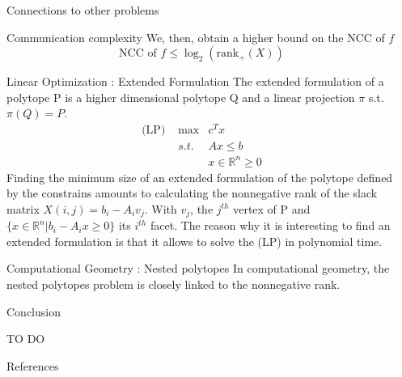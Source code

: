 \documentclass[final]{beamer}
\newlength{\sepwid}
\newlength{\onecolwid}
\begin{document}
\begin{frame}
\begin{columns}[t]
\begin{column}{\onecolwid}
\begin{columns}[t]
\begin{column}{\onecolwid}
\begin{exampleblock}{Connections to other problems}
\begin{block}{Communication complexity}
    We, then, obtain a higher bound on the NCC of $f$
    \[\text{NCC of } f \leq \log_2(\text{rank}_+(X))
    \]
\end{block}

\begin{block}{Linear Optimization : Extended Formulation}
The extended formulation of a polytope P is a higher dimensional polytope Q and a linear projection $\pi$ s.t. $\pi(Q) = P$.
    \begin{align*}
    \text{(LP) } & \max & c^T x\\
     &s.t. & Ax\leq b\\
     & & x \in \mathbb{R}^n \geq 0
    \end{align*}
    Finding the minimum size of an extended formulation of the polytope defined by the constrains amounts to calculating the nonnegative rank of the slack matrix $X(i,j) = b_i-A_iv_j$. With $v_j$, the $j^{th}$ vertex of P and $\{x\in \mathbb{R}^n | b_i-A_ix\geq 0\}$ its $i^{th}$ facet.
    The reason why it is interesting to find an extended formulation is that it allows to solve the (LP) in polynomial time.
\end{block}
\begin{block}{Computational Geometry : Nested polytopes}
 In computational geometry, the nested polytopes problem is closely linked to the nonnegative rank.
\end{block}

\end{exampleblock}


\begin{alertblock}{Conclusion}

TO DO

\end{alertblock}


\begin{alertblock}{References}

\begin{thebibliography}{99}
\end{thebibliography}

\end{alertblock}
\end{column} %
\end{columns}
\end{column}
\begin{column}{\sepwid}
\end{column} %
\end{columns} %
\end{frame} %
\end{document}
